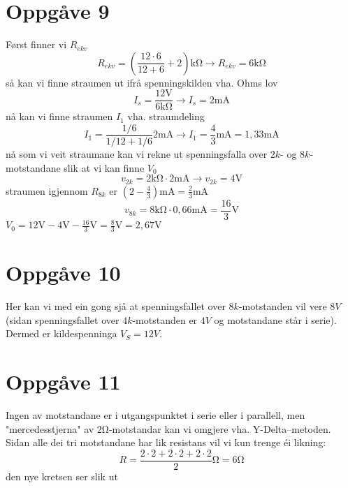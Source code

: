 \documentclass[12pt,a4paper]{article}
\begin{document}
	\section{Oppgåve 9}
	  Først finner vi $R_{ekv}$
		\begin{equation}
			R_{ekv}=\left( \frac{12\cdot6}{12+6}+2 \right) \si{\kilo\ohm}
			\rightarrow R_{ekv}= 6\si{\kilo\ohm}
		\end{equation}
		så kan vi finne straumen ut ifrå spenningskilden vha. Ohms lov
		\begin{equation}
			I_s=\frac{12\si{\volt}}{6\si{\kilo\ohm}}\rightarrow I_s=2\si{\milli\ampere}
		\end{equation}
		nå kan vi finne straumen $I_1$ vha. straumdeling
		\begin{equation}
			I_1 = \frac{1/6}{1/12+1/6}2\si{\milli\ampere}
			\rightarrow I_1 = \frac{4}{3}\si{\milli\ampere}=1,33\si{\milli\ampere}
		\end{equation}
		nå som vi veit straumane kan vi rekne ut spenningsfalla over $2k$- og $8k$-motstandane
		slik at vi kan finne $V_0$
		\begin{equation}
			v_{2k}=2\si{\kilo\ohm}\cdot2\si{\milli\ampere}\rightarrow v_{2k}=4\si{\volt}
		\end{equation}
		straumen igjennom $R_{8k}$ er $(2-\frac{4}{3})\si{\milli\ampere}
		=\frac{2}{3}\si{\milli\ampere}$
		\begin{equation}
			v_{8k}=8\si{\kilo\ohm}\cdot0,66\si{\milli\ampere}=\frac{16}{3}\si{\volt}
		\end{equation}
		$V_0=12\si{\volt}-4\si{\volt}-\frac{16}{3}\si{\volt} = \frac{8}{3}\si{\volt}=2,67\si{\volt}$

	\section{Oppgåve 10}
	  Her kan vi med ein gong sjå at spenningsfallet over $8k$-motstanden vil vere
		$8V$ (sidan spenningsfallet over $4k$-motstanden er $4V$ og motstandane står
		i serie). Dermed er kildespenninga $V_S = 12V$.

	\section{Oppgåve 11}
	  Ingen av motstandane er i utgangspunktet i serie eller i parallell, men
		"mercedesstjerna" av $2\si{\ohm}$-motstandar kan vi omgjere vha. Y-Delta–metoden.
		Sidan alle dei tri motstandane har lik resistans vil vi kun trenge éi likning:
		\begin{equation}
			R = \frac{2\cdot2 + 2\cdot2 + 2\cdot2}{2}\si{\ohm}=6\si{\ohm}
		\end{equation}
		den nye kretsen ser slik ut
\end{document}
